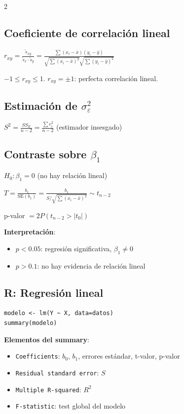 \documentclass[9pt,a4paper]{article}
\begin{document}
\begin{multicols}{2}
\subsection{Coeficiente de correlación lineal}
\begin{formulabox}
$r_{xy}=\frac{\tilde{s}_{xy}}{\tilde{s}_x\cdot\tilde{s}_y}=\frac{\sum(x_i-\bar{x})(y_i-\bar{y})}{\sqrt{\sum(x_i-\bar{x})^2}\sqrt{\sum(y_i-\bar{y})^2}}$
\end{formulabox}
$-1\leq r_{xy}\leq 1$. \quad $r_{xy}=\pm 1$: perfecta correlación lineal.

\subsection{Estimación de $\sigma_\varepsilon^2$}
\begin{formulabox}
$S^2=\frac{SS_E}{n-2}=\frac{\sum e_i^2}{n-2}$ (estimador insesgado)
\end{formulabox}

\subsection{Contraste sobre $\beta_1$}
$H_0:\beta_1=0$ (no hay relación lineal)
\begin{formulabox}
$T=\frac{b_1}{\text{SE}(b_1)}=\frac{b_1}{S/\sqrt{\sum(x_i-\bar{x})^2}}\sim t_{n-2}$
\end{formulabox}

p-valor $=2P(t_{n-2}>|t_0|)$

\textbf{Interpretación}:
\begin{itemize}[leftmargin=*]
\item $p<0.05$: regresión significativa, $\beta_1\neq 0$
\item $p>0.1$: no hay evidencia de relación lineal
\end{itemize}

\subsection{R: Regresión lineal}
\begin{verbatim}
modelo <- lm(Y ~ X, data=datos)
summary(modelo)
\end{verbatim}

\textbf{Elementos del summary}:
\begin{itemize}[leftmargin=*]
\item \texttt{Coefficients}: $b_0$, $b_1$, errores estándar, t-valor, p-valor
\item \texttt{Residual standard error}: $S$
\item \texttt{Multiple R-squared}: $R^2$
\item \texttt{F-statistic}: test global del modelo
\end{itemize}


\end{multicols}
\end{document}

